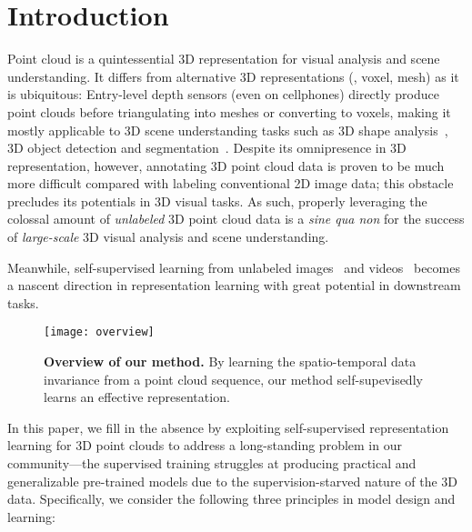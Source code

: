 \documentclass[10pt,twocolumn,letterpaper]{article}
\makeatletter
\renewcommand{\paragraph}{\@startsection{paragraph}{4}{\z@}{0ex \@plus 0ex \@minus 0ex}{-1em}{\hskip\parindent\normalfont\normalsize\bfseries}}
\makeatother
\begin{document}
\section{Introduction}

Point cloud is a quintessential 3D representation for visual analysis and scene understanding. It differs from alternative 3D representations (\eg, voxel, mesh) as it is ubiquitous: Entry-level depth sensors (even on cellphones) directly produce point clouds before triangulating into meshes or converting to voxels, making it mostly applicable to 3D scene understanding tasks such as 3D shape analysis~\cite{chang2015shapenet}, 3D object detection and segmentation~\cite{song2015sun,dai2017scannet}. Despite its omnipresence in 3D representation, however, annotating 3D point cloud data is proven to be much more difficult compared with labeling conventional 2D image data; this obstacle precludes its potentials in 3D visual tasks. As such, properly leveraging the colossal amount of \emph{unlabeled} 3D point cloud data is a \emph{sine qua non} for the success of \emph{large-scale} 3D visual analysis and scene understanding.

Meanwhile, self-supervised learning from unlabeled images~\cite{doersch2015unsupervised,oord2018representation,hjelm2018learning,he2020momentum,chen2020simple,grill2020bootstrap,chen2021exploring} and videos~\cite{sermanet2018time,zhuang2020unsupervised,knights2020temporally,qian2020spatiotemporal} becomes a nascent direction in representation learning with great potential in downstream tasks.

\begin{figure}[t!]
    \centering
    \texttt{[image: overview]}
    \caption{\textbf{Overview of our method.} By learning the spatio-temporal data invariance from a point cloud sequence, our method self-supevisedly learns an effective representation.}
    \label{fig:illustration}
\end{figure}

In this paper, we fill in the absence by exploiting self-supervised representation learning for 3D point clouds to address a long-standing problem in our community---the supervised training struggles at producing practical and generalizable pre-trained models due to the supervision-starved nature of the 3D data. Specifically, we consider the following three principles in model design and learning:

\paragraph{Simplicity}
\end{document}
